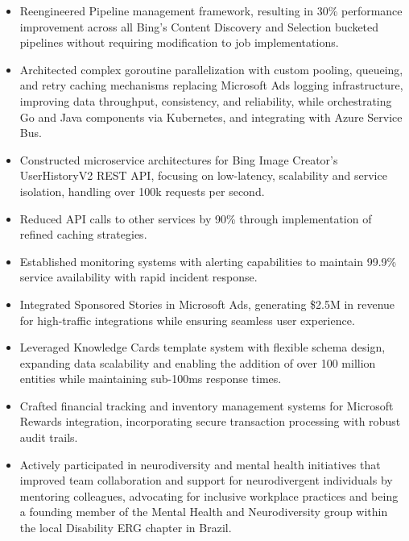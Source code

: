 \begin{itemize}
    \item \small{Reengineered Pipeline management framework, resulting in 30\% performance
        improvement across all Bing's Content Discovery and Selection bucketed pipelines without
        requiring modification to job implementations.}

    \item \small{Architected complex goroutine parallelization with custom pooling, queueing, and retry 
        caching mechanisms replacing Microsoft Ads logging infrastructure, improving data throughput,
        consistency, and reliability, while orchestrating Go and Java components via Kubernetes, and
        integrating with Azure Service Bus.}
    
    \item \small{Constructed microservice architectures for Bing Image Creator's UserHistoryV2 REST 
        API, focusing on low-latency, scalability and service isolation, handling over 100k requests per 
        second.}
    \item \small{Reduced API calls to other services by 90\% through implementation of refined caching strategies.}

    \item \small{Established monitoring systems with alerting capabilities to maintain 99.9\%
        service availability with rapid incident response.}


    \item \small{Integrated Sponsored Stories in Microsoft Ads, generating \$2.5M in revenue for
        high-traﬀic integrations while ensuring seamless user experience.}

    \item \small{Leveraged Knowledge Cards template system with flexible schema design, expanding
        data scalability and enabling the addition of over 100 million entities while maintaining
        sub-100ms response times.}

    \item \small{Crafted financial tracking and inventory management systems for Microsoft Rewards
        integration, incorporating secure transaction processing with robust audit trails.}

    \item \small{Actively participated in neurodiversity and mental health initiatives that
        improved team collaboration and support for neurodivergent individuals by mentoring colleagues,
        advocating for inclusive workplace practices and being a founding member of the Mental Health and
        Neurodiversity group within the local Disability ERG chapter in Brazil.}
\end{itemize}